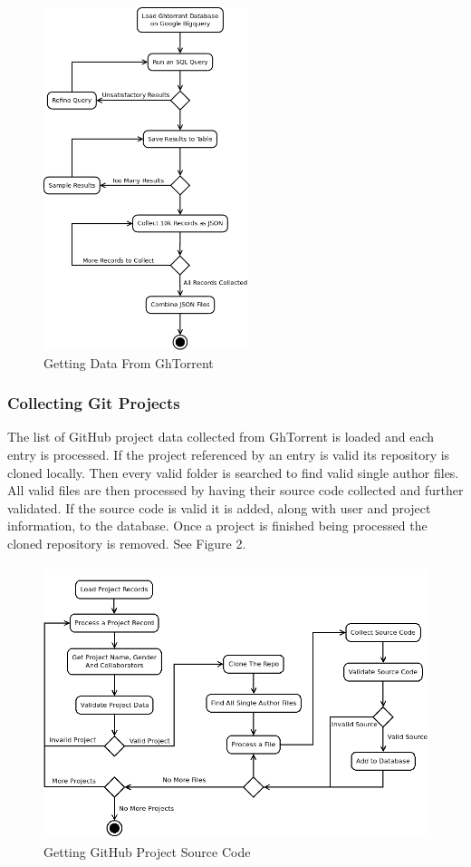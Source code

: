 \documentclass{article}
\begin{document}
\begin{figure}[t]
    \centering
    \includegraphics[height=10cm]{diagrams/ght_process.png}
    \caption{Getting Data From GhTorrent}
\end{figure}

\subsubsection*{Collecting Git Projects}
The list of GitHub project data collected from GhTorrent is loaded and each entry is processed. If the project referenced by an entry is valid its repository is cloned locally. Then every valid folder is searched to find valid single author files. All valid files are then processed by having their source code collected and further validated. If the source code is valid it is added, along with user and project information, to the database. Once a project is finished being processed the cloned repository is removed. See Figure 2.

\begin{figure}[t]
    \centering
    \includegraphics[height=8cm]{diagrams/projects.png}
    \caption{Getting GitHub Project Source Code}
\end{figure}
\end{document}
